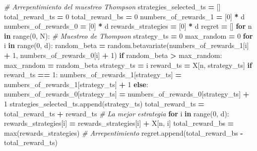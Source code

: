 \documentclass[]{book}
\newenvironment{Shaded}{\begin{snugshade}}{\end{snugshade}}
\newcommand{\BuiltInTok}[1]{#1}
\newcommand{\CommentTok}[1]{\textcolor[rgb]{0.56,0.35,0.01}{\textit{#1}}}
\newcommand{\ControlFlowTok}[1]{\textcolor[rgb]{0.13,0.29,0.53}{\textbf{#1}}}
\newcommand{\DecValTok}[1]{\textcolor[rgb]{0.00,0.00,0.81}{#1}}
\newcommand{\KeywordTok}[1]{\textcolor[rgb]{0.13,0.29,0.53}{\textbf{#1}}}
\newcommand{\NormalTok}[1]{#1}
\newcommand{\OperatorTok}[1]{\textcolor[rgb]{0.81,0.36,0.00}{\textbf{#1}}}
\begin{document}
\begin{Shaded}
\begin{Highlighting}[]
\CommentTok{# Arrepentimiento del muestreo Thompson}
\NormalTok{strategies_selected_ts }\OperatorTok{=}\NormalTok{ []}
\NormalTok{total_reward_ts }\OperatorTok{=} \DecValTok{0}
\NormalTok{total_reward_bs }\OperatorTok{=} \DecValTok{0}
\NormalTok{numbers_of_rewards_1 }\OperatorTok{=}\NormalTok{ [}\DecValTok{0}\NormalTok{] }\OperatorTok{*}\NormalTok{ d}
\NormalTok{numbers_of_rewards_0 }\OperatorTok{=}\NormalTok{ [}\DecValTok{0}\NormalTok{] }\OperatorTok{*}\NormalTok{ d}
\NormalTok{rewards_strategies }\OperatorTok{=}\NormalTok{ [}\DecValTok{0}\NormalTok{] }\OperatorTok{*}\NormalTok{ d}
\NormalTok{regret }\OperatorTok{=}\NormalTok{ []}
\ControlFlowTok{for}\NormalTok{ n }\KeywordTok{in} \BuiltInTok{range}\NormalTok{(}\DecValTok{0}\NormalTok{, N):}
    \CommentTok{# Muestreo de Thompson}
\NormalTok{    strategy_ts }\OperatorTok{=} \DecValTok{0}
\NormalTok{    max_random }\OperatorTok{=} \DecValTok{0}
    \ControlFlowTok{for}\NormalTok{ i }\KeywordTok{in} \BuiltInTok{range}\NormalTok{(}\DecValTok{0}\NormalTok{, d):}
\NormalTok{        random_beta }\OperatorTok{=}\NormalTok{ random.betavariate(numbers_of_rewards_1[i] }\OperatorTok{+} \DecValTok{1}\NormalTok{,}
\NormalTok{                                         numbers_of_rewards_0[i] }\OperatorTok{+} \DecValTok{1}\NormalTok{)}
        \ControlFlowTok{if}\NormalTok{ random_beta }\OperatorTok{>}\NormalTok{ max_random:}
\NormalTok{            max_random }\OperatorTok{=}\NormalTok{ random_beta}
\NormalTok{            strategy_ts }\OperatorTok{=}\NormalTok{ i}
\NormalTok{    reward_ts }\OperatorTok{=}\NormalTok{ X[n, strategy_ts]}
    \ControlFlowTok{if}\NormalTok{ reward_ts }\OperatorTok{==} \DecValTok{1}\NormalTok{:}
\NormalTok{        numbers_of_rewards_1[strategy_ts] }\OperatorTok{=}\NormalTok{ numbers_of_rewards_1[strategy_ts] }\OperatorTok{+} \DecValTok{1}
    \ControlFlowTok{else}\NormalTok{:}
\NormalTok{        numbers_of_rewards_0[strategy_ts] }\OperatorTok{=}\NormalTok{ numbers_of_rewards_0[strategy_ts] }\OperatorTok{+} \DecValTok{1}
\NormalTok{    strategies_selected_ts.append(strategy_ts)}
\NormalTok{    total_reward_ts }\OperatorTok{=}\NormalTok{ total_reward_ts }\OperatorTok{+}\NormalTok{ reward_ts}
    \CommentTok{# La mejor estrategia}
    \ControlFlowTok{for}\NormalTok{ i }\KeywordTok{in} \BuiltInTok{range}\NormalTok{(}\DecValTok{0}\NormalTok{, d):}
\NormalTok{        rewards_strategies[i] }\OperatorTok{=}\NormalTok{ rewards_strategies[i] }\OperatorTok{+}\NormalTok{ X[n, i]}
\NormalTok{    total_reward_bs }\OperatorTok{=} \BuiltInTok{max}\NormalTok{(rewards_strategies)}
    \CommentTok{# Arrepentimiento}
\NormalTok{    regret.append(total_reward_bs }\OperatorTok{-}\NormalTok{ total_reward_ts)}
\end{Highlighting}
\end{Shaded}
\end{document}
